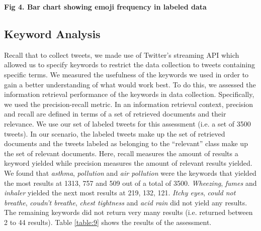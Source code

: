 \documentclass[10pt,letterpaper]{article}
\begin{document}
\textbf{Fig 4. Bar chart showing emoji frequency in labeled data}\\


\subsection{Keyword Analysis}
Recall that to collect tweets, we made use of Twitter's streaming API 
which allowed us to specify keywords to restrict the data collection to tweets containing specific terms. We measured the usefulness of the keywords we used in order to gain a better understanding of what would work best. To do this, we assessed the information retrieval performance of the keywords in data collection. Specifically, we used the precision-recall metric. In an information retrieval context, precision and recall are defined in terms of a set of retrieved documents and their relevance. We use our set of labeled tweets for this assessment (i.e. a set of 3500 tweets). In our scenario, the labeled tweets make up the set of retrieved documents and the tweets labeled as belonging to the ``relevant'' class make up the set of relevant documents. Here, recall measures the amount of results a keyword yielded while precision measures the amount of relevant results yielded. We found that \textit{asthma}, \textit{pollution} and \textit{air pollution} were the keywords that yielded the most results at 1313, 757 and 509 out of a total of 3500. \textit{Wheezing}, \textit{fumes} and \textit{inhaler} yielded the next most results at 219, 132, 121. \textit{Itchy eyes}, \textit{could not breathe}, \textit{coudn't breathe}, \textit{chest tightness} and \textit{acid rain} did not yield any results. The remaining keywords did not return very many results (i.e. returned between 2 to 44 results). Table \ref{table:9} shows the results of the assessment. 
%
\end{document}
